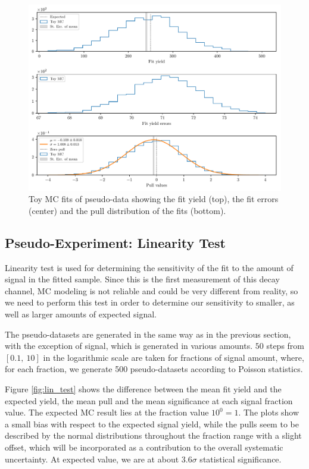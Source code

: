 \begin{figure}[H]
	\centering
	\captionsetup{width=0.8\linewidth}
	\includegraphics[width=\linewidth]{fig/toyMC}
	\caption{Toy MC fits of pseudo-data showing the fit yield (top), the fit errors (center) and the pull distribution of the fits (bottom).}
	\label{fig:toyMC}
\end{figure}

\subsection{Pseudo-Experiment: Linearity Test}
\label{sec:pseudo-experiment-linearity-test}
Linearity test is used for determining the sensitivity of the fit to the amount of signal in the fitted sample. Since this is the first measurement of this decay channel, MC modeling is not reliable and could be very different from reality, so we need to perform this test in order to determine our sensitivity to smaller, as well as larger amounts of expected signal.

The pseudo-datasets are generated in the same way as in the previous section, with the exception of signal, which is generated in various amounts. $50$ steps from $[0.1,~10]$ in the logarithmic scale are taken for fractions of signal amount, where, for each fraction, we generate 500 pseudo-datasets according to Poisson statistics.

Figure \ref{fig:lin_test} shows the difference between the mean fit yield and the expected yield, the mean pull and the mean significance at each signal fraction value. The expected MC result lies at the fraction value $10^0 = 1$. The plots show a small bias with respect to the expected signal yield, while the pulls seem to be described by the normal distributions throughout the fraction range with a slight offset, which will be incorporated as a contribution to the overall systematic uncertainty. At expected value, we are at about $3.6\sigma$ statistical significance.


